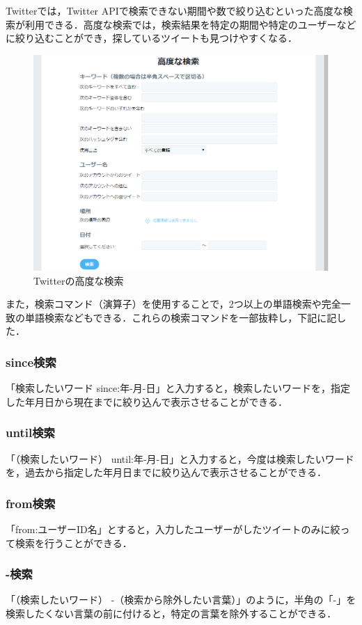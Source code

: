 \newpage
Twitterでは，Twitter APIで検索できない期間や数で絞り込むといった高度な検索が利用できる．高度な検索では，検索結果を特定の期間や特定のユーザーなどに絞り込むことができ，探しているツイートも見つけやすくなる．
\begin{figure}[htb]
\centering
\includegraphics[width=13cm]{img/Twitter.png}
\caption{Twitterの高度な検索}
\end{figure}

また，検索コマンド（演算子）を使用することで，2つ以上の単語検索や完全一致の単語検索などもできる．これらの検索コマンドを一部抜粋し，下記に記した．

\subsubsection{since検索}
「検索したいワード since:年-月-日」と入力すると，検索したいワードを，指定した年月日から現在までに絞り込んで表示させることができる．
\subsubsection{until検索}
「（検索したいワード） until:年-月-日」と入力すると，今度は検索したいワードを，過去から指定した年月日までに絞り込んで表示させることができる．
\subsubsection{from検索}
「from:ユーザーID名」とすると，入力したユーザーがしたツイートのみに絞って検索を行うことができる．
\subsubsection{-検索}
「（検索したいワード） -（検索から除外したい言葉）」のように，半角の「-」を検索したくない言葉の前に付けると，特定の言葉を除外することができる．

